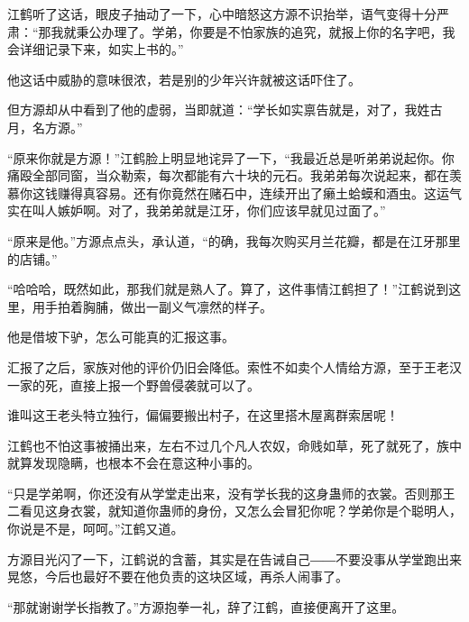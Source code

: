 \begin{this_body}
江鹤听了这话，眼皮子抽动了一下，心中暗怒这方源不识抬举，语气变得十分严肃：“那我就秉公办理了。学弟，你要是不怕家族的追究，就报上你的名字吧，我会详细记录下来，如实上书的。”

他这话中威胁的意味很浓，若是别的少年兴许就被这话吓住了。

但方源却从中看到了他的虚弱，当即就道：“学长如实禀告就是，对了，我姓古月，名方源。”

“原来你就是方源！”江鹤脸上明显地诧异了一下，“我最近总是听弟弟说起你。你痛殴全部同窗，当众勒索，每次都能有六十块的元石。我弟弟每次说起来，都在羡慕你这钱赚得真容易。还有你竟然在赌石中，连续开出了癞土蛤蟆和酒虫。这运气实在叫人嫉妒啊。对了，我弟弟就是江牙，你们应该早就见过面了。”

“原来是他。”方源点点头，承认道，“的确，我每次购买月兰花瓣，都是在江牙那里的店铺。”

“哈哈哈，既然如此，那我们就是熟人了。算了，这件事情江鹤担了！”江鹤说到这里，用手拍着胸脯，做出一副义气凛然的样子。

他是借坡下驴，怎么可能真的汇报这事。

汇报了之后，家族对他的评价仍旧会降低。索性不如卖个人情给方源，至于王老汉一家的死，直接上报一个野兽侵袭就可以了。

谁叫这王老头特立独行，偏偏要搬出村子，在这里搭木屋离群索居呢！

江鹤也不怕这事被捅出来，左右不过几个凡人农奴，命贱如草，死了就死了，族中就算发现隐瞒，也根本不会在意这种小事的。

“只是学弟啊，你还没有从学堂走出来，没有学长我的这身蛊师的衣裳。否则那王二看见这身衣裳，就知道你蛊师的身份，又怎么会冒犯你呢？学弟你是个聪明人，你说是不是，呵呵。”江鹤又道。

方源目光闪了一下，江鹤说的含蓄，其实是在告诫自己――不要没事从学堂跑出来晃悠，今后也最好不要在他负责的这块区域，再杀人闹事了。

“那就谢谢学长指教了。”方源抱拳一礼，辞了江鹤，直接便离开了这里。

\end{this_body}

